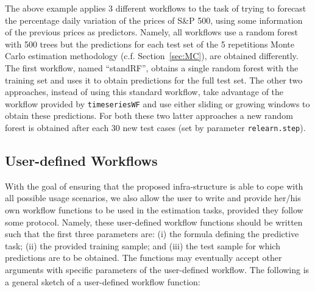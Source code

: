 \documentclass[10pt,a4paper]{article}\usepackage[]{graphicx}\usepackage[]{color}
\begin{document}
The above example applies 3 different workflows to the task of trying to forecast the percentage daily variation of the prices of S\&P 500, using some information of the previous prices as predictors. Namely, all workflows use a random forest with 500 trees but the predictions for each test set of the 5 repetitions Monte Carlo estimation methodology (c.f. Section~\ref{sec:MC}), are obtained differently. The first workflow, named ``standRF'', obtains a single random forest with the training set and uses it to obtain predictions for the full test set. The other two approaches, instead of using this standard workflow, take advantage of the workflow provided by \texttt{timeseriesWF} and use either  sliding  or growing windows to obtain these predictions. For both these two latter approaches a new random forest is obtained after each 30 new test cases (set by parameter \texttt{relearn.step}).


\subsection{User-defined Workflows}

With the goal of ensuring that the
proposed infra-structure is able to cope with all  possible usage
scenarios, we also allow the user to write and provide her/his own workflow functions to be used in the estimation tasks, provided they follow some protocol. Namely, these
user-defined workflow functions should be written such that the
first three parameters are: (i) the formula defining the predictive
task; (ii) the provided training sample; and (iii) the test sample
for which predictions are to be obtained. The functions may eventually
accept other arguments with specific parameters of the user-defined workflow. The
following is a general sketch of a user-defined workflow function:
\end{document}

